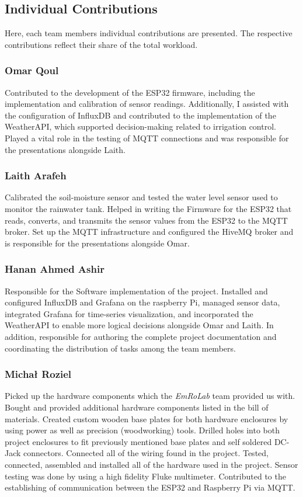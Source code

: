 \documentclass[paper=a4,fontsize=12pt,ngerman]{scrartcl}
\begin{document}
\subsection{Individual Contributions}
Here, each team members individual contributions are presented. The respective contributions reflect their share of the total workload.

\subsubsection{Omar Qoul}
Contributed to the development of the ESP32 firmware, including the implementation and calibration of sensor readings. Additionally, I assisted with the configuration of InfluxDB and contributed to the implementation of the WeatherAPI, which supported decision-making related to irrigation control. Played a vital role in the testing of MQTT connections and was responsible for the presentations alongside Laith.

\subsubsection{Laith Arafeh}
Calibrated the soil-moisture sensor and tested the water level sensor used to monitor the rainwater tank. Helped in writing the Firmware for the ESP32 that reads, converts, and transmits the sensor values from the ESP32 to the MQTT broker. 
Set up the MQTT infrastructure and configured the HiveMQ broker and is responsible for the presentations alongside Omar.


\subsubsection{Hanan Ahmed Ashir}
Responsible for the Software implementation of the project. Installed and configured InfluxDB and Grafana on the raspberry Pi, managed sensor data, integrated Grafana for time-series visualization, and incorporated the WeatherAPI to enable more logical decisions alongside Omar and Laith. In addition, responsible for authoring the complete project documentation and coordinating the distribution of tasks among the team members.

\subsubsection{Micha{\l} Roziel}

Picked up the hardware components which the \textit{EmRoLab} team provided us with. Bought and provided additional hardware components listed in the bill of materials. Created custom wooden base plates for both hardware enclosures by using power as well as precision (woodworking) tools.
Drilled holes into both project enclosures to fit previously mentioned base plates and self soldered DC-Jack connectors. Connected all of the wiring found in the project. Tested, connected, assembled and installed all of the hardware used in the project.
Sensor testing was done by using a high fidelity Fluke multimeter.
Contributed to the establishing of communication between the ESP32 and Raspberry Pi via MQTT. 
\end{document}
